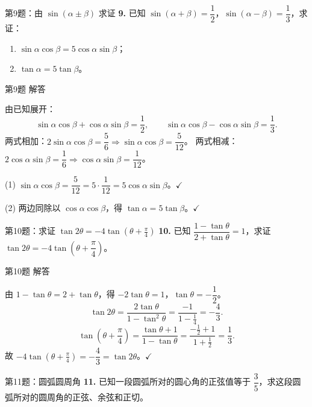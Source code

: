 \documentclass[10pt,aspectratio=169,serif]{beamer}
\begin{document}
\begin{frame}[t]{第9题：由 $\sin(\alpha\pm\beta)$ 求证}
\textbf{9.} 已知 $\sin(\alpha+\beta)=\dfrac12$，$\sin(\alpha-\beta)=\dfrac13$，求证：
\begin{enumerate}
  \item $\sin\alpha\cos\beta=5\cos\alpha\sin\beta$；
  \item $\tan\alpha=5\tan\beta$。
\end{enumerate}
\end{frame}

\begin{frame}[t]{第9题 解答}
\begin{tcolorbox}[colback=orange!10,colframe=orange,title=\textbf{证明}]
由已知展开：
\[
\sin\alpha\cos\beta+\cos\alpha\sin\beta=\frac12,\qquad
\sin\alpha\cos\beta-\cos\alpha\sin\beta=\frac13.
\]
两式相加：$2\sin\alpha\cos\beta=\dfrac56\Rightarrow\sin\alpha\cos\beta=\dfrac5{12}$。
两式相减：$2\cos\alpha\sin\beta=\dfrac16\Rightarrow\cos\alpha\sin\beta=\dfrac1{12}$。

(1) $\sin\alpha\cos\beta=\dfrac5{12}=5\cdot\dfrac1{12}=5\cos\alpha\sin\beta$。$\checkmark$

(2) 两边同除以 $\cos\alpha\cos\beta$，得 $\tan\alpha=5\tan\beta$。$\checkmark$
\end{tcolorbox}
\end{frame}

\begin{frame}[t]{第10题：求证 $\tan 2\theta=-4\tan(\theta+\frac{\pi}{4})$}
\textbf{10.} 已知 $\dfrac{1-\tan\theta}{2+\tan\theta}=1$，求证 $\tan 2\theta=-4\tan\!\left(\theta+\dfrac{\pi}{4}\right)$。
\end{frame}

\begin{frame}[t]{第10题 解答}
\begin{tcolorbox}[colback=orange!10,colframe=orange,title=\textbf{证明}]
由 $1-\tan\theta=2+\tan\theta$，得 $-2\tan\theta=1$，$\tan\theta=-\dfrac12$。
\[
\tan 2\theta=\frac{2\tan\theta}{1-\tan^2\theta}=\frac{-1}{1-\frac14}=-\frac43.
\]
\[
\tan\!\left(\theta+\frac{\pi}{4}\right)=\frac{\tan\theta+1}{1-\tan\theta}=\frac{-\frac12+1}{1+\frac12}=\frac13.
\]
故 $-4\tan(\theta+\frac{\pi}{4})=-\dfrac43=\tan 2\theta$。$\checkmark$
\end{tcolorbox}
\end{frame}

\begin{frame}[t]{第11题：圆弧圆周角}
\textbf{11.} 已知一段圆弧所对的圆心角的正弦值等于 $\dfrac35$，求这段圆弧所对的圆周角的正弦、余弦和正切。
\end{frame}
\end{document}
